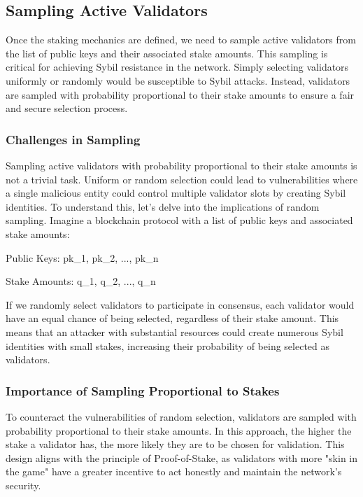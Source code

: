 \subsection{Sampling Active Validators}
Once the staking mechanics are defined, we need to sample active validators from the list of public keys and their associated stake amounts. This sampling is critical for achieving Sybil resistance in the network. Simply selecting validators uniformly or randomly would be susceptible to Sybil attacks. Instead, validators are sampled with probability proportional to their stake amounts to ensure a fair and secure selection process.

\subsubsection{Challenges in Sampling}
Sampling active validators with probability proportional to their stake amounts is not a trivial task. Uniform or random selection could lead to vulnerabilities where a single malicious entity could control multiple validator slots by creating Sybil identities. To understand this, let's delve into the implications of random sampling.
Imagine a blockchain protocol with a list of public keys and associated stake amounts:



  Public Keys:  pk_1, pk_2, ..., pk_n

  Stake Amounts:  q_1, q_2, ..., q_n
 
If we randomly select validators to participate in consensus, each validator would have an equal chance of being selected, regardless of their stake amount. This means that an attacker with substantial resources could create numerous Sybil identities with small stakes, increasing their probability of being selected as validators.

\subsubsection{Importance of Sampling Proportional to Stakes}

To counteract the vulnerabilities of random selection, validators are sampled with probability proportional to their stake amounts. In this approach, the higher the stake a validator has, the more likely they are to be chosen for validation. This design aligns with the principle of Proof-of-Stake, as validators with more "skin in the game" have a greater incentive to act honestly and maintain the network's security.

